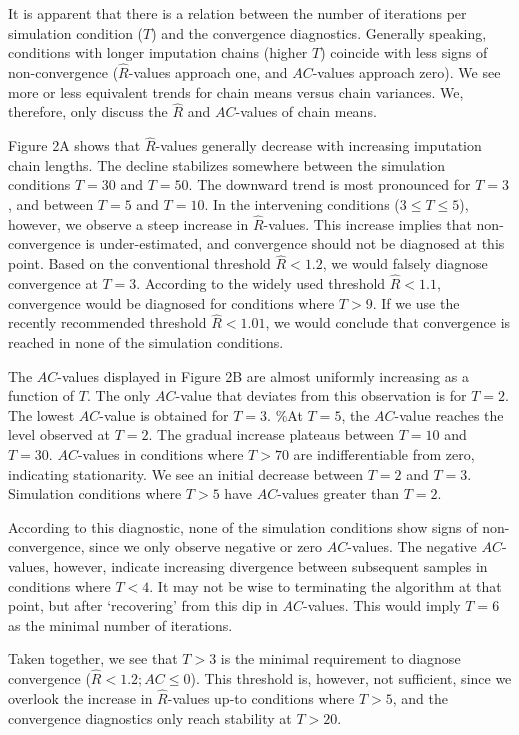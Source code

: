 \documentclass[
  Royal, times, sageapa]{sagej}
\begin{document}
It is apparent that there is a relation between the number of iterations
per simulation condition (\(T\)) and the convergence diagnostics.
Generally speaking, conditions with longer imputation chains (higher
\(T\)) coincide with less signs of non-convergence
(\(\widehat{R}\)-values approach one, and \(AC\)-values approach zero).
We see more or less equivalent trends for chain means versus chain
variances. We, therefore, only discuss the \(\widehat{R}\) and
\(AC\)-values of chain means.

Figure 2A shows that \(\widehat{R}\)-values generally decrease with
increasing imputation chain lengths. The decline stabilizes somewhere
between the simulation conditions \(T=30\) and \(T=50\). The downward
trend is most pronounced for \(T=3\), and between \(T = 5\) and
\(T = 10\). In the intervening conditions (\(3 \leq T \leq 5\)),
however, we observe a steep increase in \(\widehat{R}\)-values. This
increase implies that non-convergence is under-estimated, and
convergence should not be diagnosed at this point. Based on the
conventional threshold \(\widehat{R} < 1.2\), we would falsely diagnose
convergence at \(T=3\). According to the widely used threshold
\(\widehat{R} < 1.1\), convergence would be diagnosed for conditions
where \(T>9\). If we use the recently recommended threshold
\(\widehat{R} < 1.01\), we would conclude that convergence is reached in
none of the simulation conditions.

The \(AC\)-values displayed in Figure 2B are almost uniformly increasing
as a function of \(T\). The only \(AC\)-value that deviates from this
observation is for \(T=2\). The lowest \(AC\)-value is obtained for
\(T=3\). \%At \(T=5\), the \(AC\)-value reaches the level observed at
\(T=2\). The gradual increase plateaus between \(T=10\) and \(T=30\).
\(AC\)-values in conditions where \(T>70\) are indifferentiable from
zero, indicating stationarity. We see an initial decrease between
\(T=2\) and \(T=3\). Simulation conditions where \(T>5\) have
\(AC\)-values greater than \(T=2\).

According to this diagnostic, none of the simulation conditions show
signs of non-convergence, since we only observe negative or zero
\(AC\)-values. The negative \(AC\)-values, however, indicate increasing
divergence between subsequent samples in conditions where \(T<4\). It
may not be wise to terminating the algorithm at that point, but after
`recovering' from this dip in \(AC\)-values. This would imply \(T=6\) as
the minimal number of iterations.

Taken together, we see that \(T>3\) is the minimal requirement to
diagnose convergence (\(\widehat{R} < 1.2; AC \leq 0\)). This threshold
is, however, not sufficient, since we overlook the increase in
\(\widehat{R}\)-values up-to conditions where \(T>5\), and the
convergence diagnostics only reach stability at \(T>20\).
\end{document}
